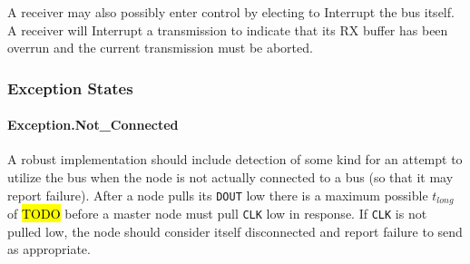 A receiver may also possibly enter control by electing to Interrupt the bus
itself. A receiver will Interrupt a transmission to indicate that its RX
buffer has been overrun and the current transmission must be aborted.

\subsubsection{Exception States}

\paragraph{Exception.{\sc Not\_Connected}}
A robust implementation should include detection of some kind for an attempt
to utilize the bus when the node is not actually connected to a bus (so that
it may report failure). After a node pulls its {\tt DOUT} low there is a
maximum possible $t_{long}$ of \hl{TODO} before a master node must pull
{\tt CLK} low in response. If {\tt CLK} is not pulled low, the node should
consider itself disconnected and report failure to send as appropriate.
